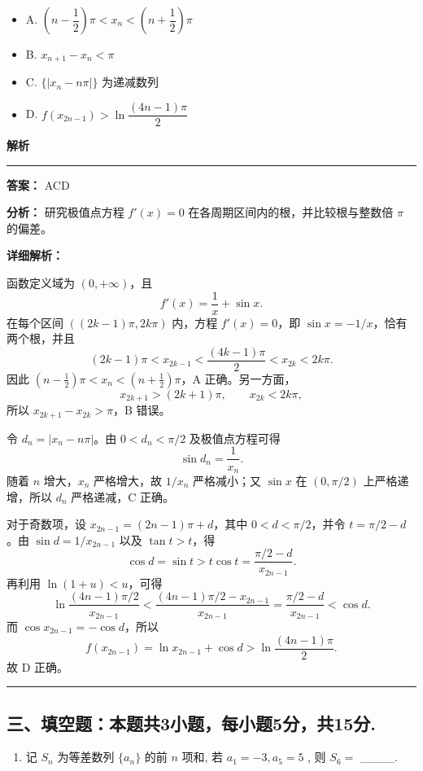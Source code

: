 \documentclass[UTF8,12pt,a4paper]{ctexart}
\renewcommand{\labelenumi}{\arabic{enumi}.}
\newenvironment{examSolutionBox}{%
  \par\medskip\begingroup
  \setlength{\leftskip}{1.0em}\setlength{\rightskip}{0.9em}%
  \noindent\textcolor{SolutionTeal}{\bfseries\large 解析}\par
  \smallskip\noindent\textcolor{SolutionRule}{\rule{\dimexpr\linewidth-\leftskip-\rightskip\relax}{0.8pt}}\par
  \smallskip\color{SolutionInk}%
}{%
  \par\smallskip\noindent\textcolor{SolutionRule}{\rule{\dimexpr\linewidth-\leftskip-\rightskip\relax}{0.8pt}}\par
  \endgroup\medskip
}
\providecommand{\tightlist}{%
  \setlength{\itemsep}{0pt}\setlength{\parskip}{0pt}}
\begin{document}
\begin{itemize}
\tightlist
\item
  A. \((n - \dfrac{1}{2})\pi < x_n < (n + \dfrac{1}{2})\pi\)
\item
  B. \(x_{n+1} - x_n < \pi\)
\item
  C. \(\{ |x_n - n\pi | \}\) 为递减数列
\item
  D. \(f(x_{2n-1}) > \ln \dfrac{(4n-1)\pi}{2}\)
\end{itemize}

\begin{examSolutionBox}

\textbf{答案：} ACD

\textbf{分析：} 研究极值点方程 \(f\prime(x)=0\) 在各周期区间内的根，并比较根与整数倍 \(\pi\) 的偏差。

\textbf{详细解析：}

函数定义域为 \((0,+\infty)\)，且
\[
   f'(x)=\frac1x+\sin x.
   \]
在每个区间 \(((2k-1)\pi,2k\pi)\) 内，方程 \(f'(x)=0\)，即 \(\sin x=-1/x\)，恰有两个根，并且
\[
   (2k-1)\pi<x_{2k-1}<\frac{(4k-1)\pi}{2}
   <x_{2k}<2k\pi.
   \]
因此 \((n-\tfrac12)\pi<x_n<(n+\tfrac12)\pi\)，A 正确。另一方面，
\[
   x_{2k+1}>(2k+1)\pi,\qquad x_{2k}<2k\pi,
   \]
所以 \(x_{2k+1}-x_{2k}>\pi\)，B 错误。

令 \(d_n=|x_n-n\pi|\)。由 \(0<d_n<\pi/2\) 及极值点方程可得
\[
   \sin d_n=\frac1{x_n}.
   \]
随着 \(n\) 增大，\(x_n\) 严格增大，故 \(1/x_n\) 严格减小；又 \(\sin x\) 在 \((0,\pi/2)\) 上严格递增，所以 \(d_n\) 严格递减，C 正确。

对于奇数项，设 \(x_{2n-1}=(2n-1)\pi+d\)，其中 \(0<d<\pi/2\)，并令 \(t=\pi/2-d\)。由 \(\sin d=1/x_{2n-1}\) 以及 \(\tan t>t\)，得
\[
   \cos d=\sin t>t\cos t
   =\frac{\pi/2-d}{x_{2n-1}}.
   \]
再利用 \(\ln(1+u)<u\)，可得
\[
   \ln\frac{(4n-1)\pi/2}{x_{2n-1}}
   <\frac{(4n-1)\pi/2-x_{2n-1}}{x_{2n-1}}
   =\frac{\pi/2-d}{x_{2n-1}}
   <\cos d.
   \]
而 \(\cos x_{2n-1}=-\cos d\)，所以
\[
   f(x_{2n-1})=\ln x_{2n-1}+\cos d
   >\ln\frac{(4n-1)\pi}{2}.
   \]
故 D 正确。

\end{examSolutionBox}

\subsection{三、填空题：本题共3小题，每小题5分，共15分.}\label{ux4e09ux586bux7a7aux9898ux672cux9898ux51713ux5c0fux9898ux6bcfux5c0fux98985ux5206ux517115ux5206.}

\begin{enumerate}
\def\labelenumi{\arabic{enumi}.}
\setcounter{enumi}{11}
\tightlist
\item
  记 \(S_{n}\) 为等差数列 \(\{a_{n}\}\) 的前 \(n\) 项和, 若 \(a_{1} = -3, a_{5} = 5\) , 则 \(S_{6} =\) \_\_\_\_.
\end{enumerate}
\end{document}
